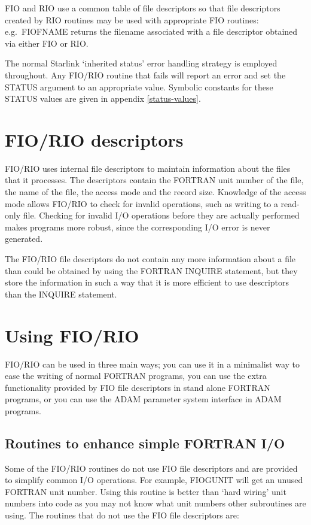 \documentclass[twoside,11pt]{article}
\renewcommand{\_}{\texttt{\symbol{95}}}
\begin{document}
FIO and RIO use a common table of file descriptors so that file descriptors
created by RIO routines may be used with appropriate FIO routines: 
e.g.\ FIO\_FNAME returns the filename associated with a file descriptor 
obtained via either FIO or RIO.

The normal Starlink `inherited status' error handling strategy is employed
throughout. Any FIO/RIO routine that fails will report an error and set the
STATUS argument to an appropriate value. Symbolic constants for these STATUS
values are given in appendix \ref{status-values}.

\section{FIO/RIO descriptors}

FIO/RIO uses internal file descriptors to maintain information about the files
that it processes. The descriptors contain the FORTRAN unit number of the file,
the name of the file, the access mode and the record size. Knowledge of the
access mode allows FIO/RIO to check for invalid operations, such as writing to
a read-only file. Checking for invalid I/O operations before they are actually
performed makes programs more robust, since the corresponding I/O error is
never generated.

The FIO/RIO file descriptors do not contain any more information about a file
than could be obtained by using the FORTRAN INQUIRE statement, but they store
the information in such a way that it is more efficient to use descriptors than
the INQUIRE statement.

\section{Using FIO/RIO}

FIO/RIO can be used in three main ways; you can use it in a minimalist way to
ease the writing of normal FORTRAN programs, you can use the extra
functionality provided by FIO file descriptors in stand alone FORTRAN programs,
or you can use the ADAM parameter system interface in ADAM programs.

\subsection{Routines to enhance simple FORTRAN I/O}

Some of the FIO/RIO routines do not use FIO file descriptors and are provided
to simplify common I/O operations. For example, FIO\_GUNIT will get an unused
FORTRAN unit number. Using this routine is better than `hard wiring' unit
numbers into code as you may not know what unit numbers other subroutines are
using. The routines that do not use the FIO file descriptors are:
\end{document}
